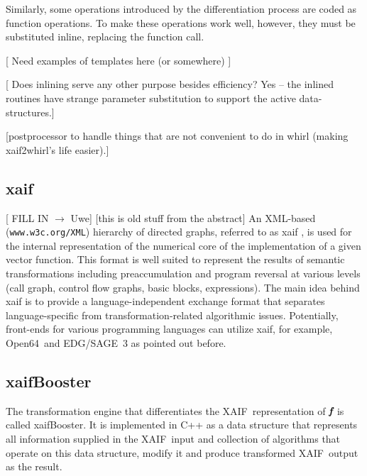 \documentclass[11pt]{article}
\newcommand{\OpenSixtyFour}{Open64}
\newcommand{\xaif}{XAIF}
\newcommand{\xaifBooster}{xaifBooster}
\newcommand{\bmf}{\mbox{\bf\em f}}
\begin{document}
Similarly, some operations introduced by the differentiation process
are coded as function operations. To make these operations work well,
however, they must be substituted inline, replacing the function call.

{\color{red}
[ Need examples of templates here (or somewhere) ]

[ Does inlining serve any other purpose besides efficiency?  Yes --
the inlined routines have strange parameter substitution to support
the active data-structures.]

[postprocessor to handle things that are not convenient to do in whirl
(making xaif2whirl's life easier).]
}

\subsection{xaif} \label{ssec:xaif}
{\color{red} [ FILL IN $\to$ Uwe] } 
{\color{blue} [this is old stuff from the abstract] 
An XML-based ({\tt www.w3c.org/XML}) hierarchy of directed graphs, referred to as xaif 
\cite{HNN02}, is used for the 
internal representation of the numerical core of the implementation
of a given vector function. This format is 
well suited to represent the results of  semantic transformations including 
preaccumulation \cite{BiHa96,CDB96,GrRe91} and 
program reversal \cite{Gri92,WaGr01} at various levels (call graph, control 
flow graphs, basic blocks, expressions). 
The main idea behind xaif is to provide a language-independent exchange
format that separates language-specific from transformation-related 
algorithmic issues. Potentially, front-ends for various programming languages 
can utilize xaif, for example, \OpenSixtyFour\ and EDG/SAGE~3 as pointed out before.
}
\subsection{\xaifBooster} 
The transformation engine that differentiates the \xaif\ representation of 
$\bmf$ is called \xaifBooster. It is implemented in C++ as a 
data structure that represents all information supplied in the \xaif\ input 
and collection of algorithms that operate on this data structure, modify 
it and produce transformed  \xaif\ output as the result. 
\end{document}
